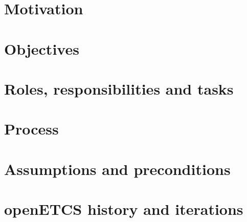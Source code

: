 %

\section{Motivation}
\section{Objectives}
\section{Roles, responsibilities and tasks}
\section{Process}
\section{Assumptions and preconditions}
\section{openETCS history and iterations}
